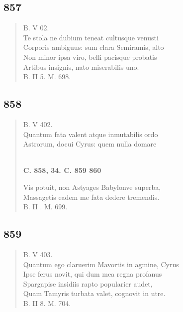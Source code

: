 \documentclass[11pt, a4paper]{report}
\begin{document}
            \subsection*{857}
      \begin{verse}
      B. V 02. \\ Te stola ne dubium teneat cultusque venusti \\ Corporis ambiguus: sum clara Semiramis, alto \\ Non minor ipsa viro, belli pacisque probatis \\ Artibus insignis, nato miserabilis uno. \\ B. II 5. M. 698. \\ 
      \end{verse}
  
            \subsection*{858}
      \begin{verse}
      B. V 402. \\ Quantum fata valent atque inmutabilis ordo \\ Astrorum, docui Cyrus: quem nulla domare \\ 
        ﻿\pagebreak 
     \marginpar{[312]} \begin{center} \textbf{C. 858, 34. C. 859 860} \end{center}Vis potuit, non Astyages Babylonve superba, \\ Massagetis eadem me fata dedere tremendis. \\ B. II . M. 699. \\ 
      \end{verse}
  
            \subsection*{859}
      \begin{verse}
      B. V 403. \\ Quantum ego claruerim Mavortis in agmine, Cyrus \\ Ipse ferus novit, qui dum mea regna profanus \\ Spargapise insidiis rapto popularier audet, \\ Quam Tamyris turbata valet, cognovit in utre. \\ B. II 8. M. 704. \\ 
      \end{verse}
  
\end{document}
